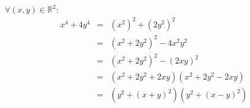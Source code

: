 $\forall (x,y)\in\mathbb{R}^2$:
\begin{eqnarray*}
  x^4+4y^4 &=& (x^2)^2+(2y^2)^2 \\
    &=& (x^2+2y^2)^2 - 4x^2y^2 \\
    &=& (x^2+2y^2)^2 - (2xy)^2 \\
    &=& (x^2+2y^2+2xy)(x^2+2y^2-2xy) \\
    &=& \left(y^2+(x+y)^2\right)\left( y^2+(x-y)^2 \right)
\end{eqnarray*}
